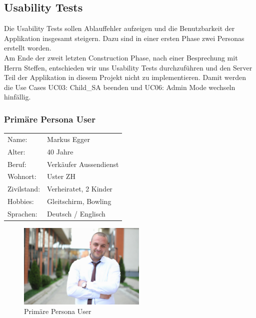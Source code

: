 \newpage
\subsection{Usability Tests}

Die Usability Tests sollen Ablauffehler aufzeigen und die Benutzbarkeit der Applikation insgesamt steigern. Dazu sind in einer ersten Phase zwei Personas erstellt worden.
\\
\label{UsabilityEntscheid}
Am Ende der zweit letzten Construction Phase, nach einer Besprechung mit Herrn Steffen, entschieden wir uns Usability Tests durchzuführen und den Server Teil der Applikation in diesem Projekt nicht zu implementieren.
Damit werden die Use Cases UC03: Child\_SA beenden und UC06: Admin Mode wechseln hinfällig.

\subsubsection{Primäre Persona User}





\noindent\begin{minipage}[t]{0.5\textwidth}
\vspace{0pt}
    \begin{tabular}{ l l }
        Name: & Markus Egger \\
        Alter: & 40 Jahre \\
        Beruf: & Verkäufer Aussendienst \\
        Wohnort: & Uster ZH \\
        Zivilstand: & Verheiratet, 2 Kinder \\
        Hobbies: & Gleitschirm, Bowling \\
        Sprachen: & Deutsch / Englisch \\
    \end{tabular}
\end{minipage}
\hfill
\begin{minipage}[t]{0.5\textwidth}
\vspace{0pt}

\begin{figure}[H]
\centering
    \includegraphics[width=230px]{images/persona_business.jpg}
    \caption[Primäre Persona User]{Primäre Persona User}
\end{figure}
\end{minipage}
\medskip


